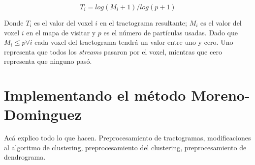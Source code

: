 $$ T_i = log(M_i + 1)/log(p+1) $$

Donde $T_i$ es el valor del voxel $i$ en el tractograma resultante; $M_i$ es 
el valor del voxel $i$ en el mapa de visitar y $p$ es el n\'umero de part\'iculas
usadas. Dado que $M_i \leq p \forall i$ cada voxel del tractograma tendr\'a un 
valor entre uno y cero. Uno representa que todos los \textit{streams} pasaron 
por el voxel, mientras que cero representa que ninguno pas\'o. \\



\section{Implementando el m\'etodo Moreno-Dominguez}
Ac\'a explico todo lo que hacen. Preprocesamiento de tractogramas, modificaciones
al algoritmo de clustering, preprocesamiento del clustering, preprocesamiento
de dendrograma.\\







